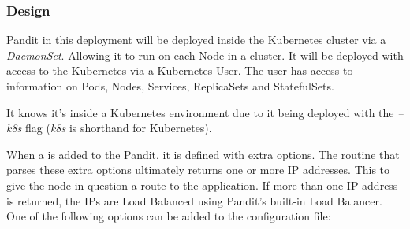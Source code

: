 \documentclass[a4paper,12pt]{report}
\begin{document}
\subsubsection{Design}

Pandit in this deployment will be deployed inside the Kubernetes cluster via a \textit{DaemonSet}. Allowing it to run on each Node in a cluster. 
It will be deployed with access to the Kubernetes via a Kubernetes User. The user has access to information on Pods, Nodes, Services, ReplicaSets and StatefulSets.

It knows it's inside a Kubernetes environment due to it being deployed with the \textit{--k8s} flag (\textit{k8s} is shorthand for Kubernetes).

When a \textit{} is added to the Pandit, it is defined with extra options.
The routine that parses these extra options ultimately returns one or more IP addresses. This to give the node in question a route to the application. If more than one IP address is returned, the IPs are Load Balanced using Pandit's built-in Load Balancer.
One of the following options can be added to the configuration file:
\end{document}
